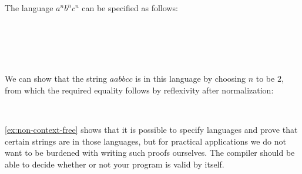 \begin{example}\label{ex:non-context-free}
The language $a^n b^n c^n$ can be specified as follows:
\begin{code}[hide]%
\>[0]\AgdaSpace{}%
\AgdaSymbol{:}\AgdaSpace{}%
\AgdaSpace{}%
\AgdaSpace{}%
\AgdaSpace{}%
\AgdaSpace{}%
\<%
\\
\>[0]\AgdaSpace{}%
\AgdaSpace{}%
\AgdaSymbol{\AgdaUnderscore{}}\AgdaSpace{}%
\AgdaSymbol{=}\AgdaSpace{}%
\AgdaInductiveConstructor{[]}\<%
\\
\>[0]\AgdaSpace{}%
\AgdaSymbol{(}\AgdaSpace{}%
\AgdaSymbol{)}\AgdaSpace{}%
\AgdaSpace{}%
\AgdaSymbol{=}\AgdaSpace{}%
\AgdaSpace{}%
\AgdaSpace{}%
\AgdaSpace{}%
\AgdaSpace{}%
\<%
\end{code}
\begin{code}%
\>[0]\AgdaSpace{}%
\AgdaSymbol{:}\AgdaSpace{}%
\<%
\\
\>[0]\AgdaSpace{}%
\AgdaSpace{}%
\AgdaSymbol{=}\AgdaSpace{}%
\AgdaFunction{Σ[}\AgdaSpace{}%
\AgdaSpace{}%
\AgdaSpace{}%
\AgdaSpace{}%
\AgdaFunction{]}\AgdaSpace{}%
\AgdaSpace{}%
\AgdaSpace{}%
\AgdaSpace{}%
\AgdaSpace{}%
\AgdaSpace{}%
\AgdaOperator{\AgdaFunction{++}}\AgdaSpace{}%
\AgdaSpace{}%
\AgdaSpace{}%
\AgdaSpace{}%
\AgdaOperator{\AgdaFunction{++}}\AgdaSpace{}%
\AgdaSpace{}%
\AgdaSpace{}%
\<%
\end{code}
We can show that the string $aabbcc$ is in this language by choosing $n$ to be $2$, from which the required equality follows by reflexivity after normalization:
\begin{code}%
\>[0]\AgdaSpace{}%
\AgdaSymbol{:}\AgdaSpace{}%
\AgdaSpace{}%
\<%
\\
\>[0]\AgdaSpace{}%
\AgdaSymbol{=}\AgdaSpace{}%
\AgdaSpace{}%
\AgdaOperator{\AgdaInductiveConstructor{,}}\AgdaSpace{}%
\<%
\end{code}
\end{example}
\cref{ex:non-context-free} shows that it is possible to specify languages and prove that certain strings are in those languages, but for practical applications we do not want to be burdened with writing such proofs ourselves. The compiler should be able to decide whether or not your program is valid by itself.

